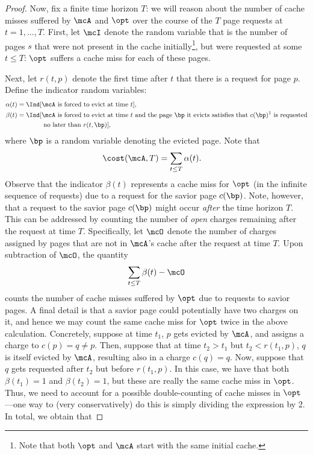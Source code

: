 \begin{proof}
    Now, fix a finite time horizon $T$: we will reason about the number of cache misses suffered by $\mcA$ and $\opt$ over the course of the $T$ page requests at $t=1,\dots,T$.
    First, let $\mcI$ denote the random variable that is the number of pages $s$ that were not present in the cache initially\footnote{Note that both $\opt$ and $\mcA$ start with the same initial cache.}, but were requested at some $t \le T$: $\opt$ suffers a cache miss for each of these pages.

    Next, let $r(t,p)$ denote the first time after $t$ that there is a request for page $p$. Define the indicator random variables:
    \begin{align}
        \alpha(t) &= \Ind[\text{$\mcA$ is forced to evict at time $t$}], \label{eqn:alpha}\\
        \beta(t) &= \Ind[\text{$\mcA$ is forced to evict at time $t$ and the page $\bp$ it evicts satisfies that $c(\bp)$\footnotemark\ is requested} \nonumber \label{eqn:beta}\\
        &\qquad\qquad\text{no later than $r(t,\bp)$}],
    \end{align}
    where $\bp$ is a random variable denoting the evicted page. 
    Note that
    \begin{align*}
        \cost(\mcA, T) &= \sum_{t \le T}\alpha(t).
    \end{align*}
    Observe that the indicator $\beta(t)$ represents a cache miss for $\opt$ (in the infinite sequence of requests) due to a request for the savior page $c(\bp)$. Note, however, that a request to the savior page $c(\bp)$ might occur \textit{after} the time horizon $T$. This can be addressed by counting the number of \textit{open} charges remaining after the request at time $T$. Specifically, let $\mcO$ denote the number of charges assigned by pages that are not in $\mcA$'s cache after the request at time $T$.
    Upon subtraction of $\mcO$, the quantity
    \begin{align*}
        \sum_{t \le T}\beta(t) - \mcO
    \end{align*}
    counts the number of cache misses suffered by $\opt$ due to requests to savior pages. A final detail is that a savior page could potentially have two charges on it, and hence we may count the same cache miss for $\opt$ twice in the above calculation. Concretely, suppose at time $t_1$, $p$ gets evicted by $\mcA$, and assigns a charge to $c(p)=q \neq p$. Then, suppose that at time $t_2 > t_1$ but $t_2 < r(t_1,p)$, $q$ is itself evicted by $\mcA$, resulting also in a charge $c(q)=q$. Now, suppose that $q$ gets requested after $t_2$ but before $r(t_1,p)$. In this case, we have that both $\beta(t_1)=1$ and $\beta(t_2)=1$, but these are really the same cache miss in $\opt$. Thus, we need to account for a possible double-counting of cache misses in $\opt$---one way to (very conservatively) do this is simply dividing the expression by 2. In total, we obtain that

\end{proof}
